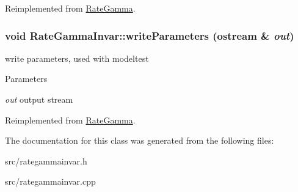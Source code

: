 Reimplemented from \hyperlink{classRateGamma_a835bb210fd8fb4552613fe49875cbfb5}{RateGamma}.\hypertarget{classRateGammaInvar_a13b6629de9e3579aacff555f1bd76db5}{
\subsubsection[{writeParameters}]{\setlength{\rightskip}{0pt plus 5cm}void RateGammaInvar::writeParameters (ostream \& {\em out})}}
\label{classRateGammaInvar_a13b6629de9e3579aacff555f1bd76db5}
write parameters, used with modeltest 
\begin{DoxyParams}{Parameters}
\item[{\em out}]output stream \end{DoxyParams}


Reimplemented from \hyperlink{classRateGamma_a88ffb33131f2cf23cfd0525e092c7717}{RateGamma}.

The documentation for this class was generated from the following files:\begin{DoxyCompactItemize}
\item 
src/rategammainvar.h\item 
src/rategammainvar.cpp\end{DoxyCompactItemize}
